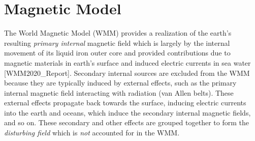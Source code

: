 \documentclass[11pt,dvipsnames]{thesis}
\begin{document}
\begin{table}[H]
{\begin{tabular}{c c S[scientific-notation=false, table-format=-1.15e-2] S[scientific-notation=false, table-format=-1.15e-2] S[scientific-notation=false, table-format=-2.1e-2]}
\bottomrule
\end{tabular}
}
\end{table}
\newpage

\section{Magnetic Model}
The World Magnetic Model (WMM) provides a realization of the earth's resulting \textit{primary internal} magnetic field which is largely by the internal movement of its liquid iron outer core and provided contributions due to magnetic materials in earth's surface and induced electric currents in sea water [WMM2020\_Report]. Secondary internal sources are excluded from the WMM because they are typically induced by external effects, such as the primary internal magnetic field interacting with radiation (van Allen belts). These external effects propagate back towards the surface, inducing electric currents into the earth and oceans, which induce the secondary internal magnetic fields, and so on. These secondary and other effects are grouped together to form the \textit{disturbing field} which is \textit{not} accounted for in the WMM.
\end{document}
